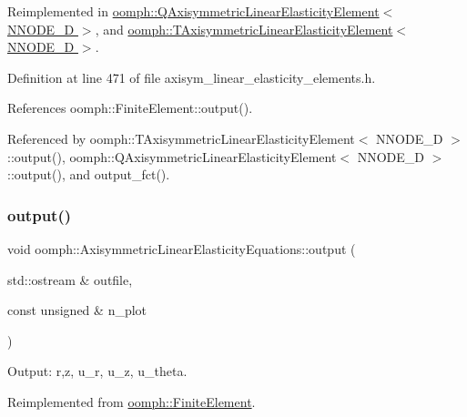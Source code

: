 Reimplemented in \hyperlink{classoomph_1_1QAxisymmetricLinearElasticityElement_adfd535d5ee563df242c0ff5febca99e2}{oomph\+::\+Q\+Axisymmetric\+Linear\+Elasticity\+Element$<$ N\+N\+O\+D\+E\+\_\+D $>$}, and \hyperlink{classoomph_1_1TAxisymmetricLinearElasticityElement_a803cb886b6c610f021fdfd41113eeab8}{oomph\+::\+T\+Axisymmetric\+Linear\+Elasticity\+Element$<$ N\+N\+O\+D\+E\+\_\+D $>$}.



Definition at line 471 of file axisym\+\_\+linear\+\_\+elasticity\+\_\+elements.\+h.



References oomph\+::\+Finite\+Element\+::output().



Referenced by oomph\+::\+T\+Axisymmetric\+Linear\+Elasticity\+Element$<$ N\+N\+O\+D\+E\+\_\+D $>$\+::output(), oomph\+::\+Q\+Axisymmetric\+Linear\+Elasticity\+Element$<$ N\+N\+O\+D\+E\+\_\+D $>$\+::output(), and output\+\_\+fct().

\mbox{\label{classoomph_1_1AxisymmetricLinearElasticityEquations_a55d90a70997efe0a5cf34e269e0cf6b8}} 
\subsubsection{\texorpdfstring{output()}{output()}\hspace{0.1cm}{\footnotesize\ttfamily [2/4]}}
{\footnotesize\ttfamily void oomph\+::\+Axisymmetric\+Linear\+Elasticity\+Equations\+::output (\begin{DoxyParamCaption}\item[{std\+::ostream \&}]{outfile,  }\item[{const unsigned \&}]{n\+\_\+plot }\end{DoxyParamCaption})\hspace{0.3cm}{\ttfamily [virtual]}}



Output\+: r,z, u\+\_\+r, u\+\_\+z, u\+\_\+theta. 



Reimplemented from \hyperlink{classoomph_1_1FiniteElement_afa9d9b2670f999b43e6679c9dd28c457}{oomph\+::\+Finite\+Element}.



